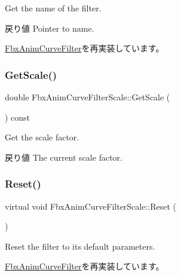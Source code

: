 Get the name of the filter. \begin{DoxyReturn}{戻り値}
Pointer to name. 
\end{DoxyReturn}


\hyperlink{class_fbx_anim_curve_filter_abd559d5052fbb072042e59241940a35c}{Fbx\+Anim\+Curve\+Filter}を再実装しています。

\mbox{\label{class_fbx_anim_curve_filter_scale_a48367ab8cb65db9bffdda7dc8c0afff8}} 
\subsubsection{\texorpdfstring{Get\+Scale()}{GetScale()}}
{\footnotesize\ttfamily double Fbx\+Anim\+Curve\+Filter\+Scale\+::\+Get\+Scale (\begin{DoxyParamCaption}{ }\end{DoxyParamCaption}) const}

Get the scale factor. \begin{DoxyReturn}{戻り値}
The current scale factor. 
\end{DoxyReturn}
\mbox{\label{class_fbx_anim_curve_filter_scale_a40e82207d205b026aaab40e52a7184c8}} 
\subsubsection{\texorpdfstring{Reset()}{Reset()}}
{\footnotesize\ttfamily virtual void Fbx\+Anim\+Curve\+Filter\+Scale\+::\+Reset (\begin{DoxyParamCaption}{ }\end{DoxyParamCaption})\hspace{0.3cm}{\ttfamily [virtual]}}

Reset the filter to its default parameters. 

\hyperlink{class_fbx_anim_curve_filter_a57fb35baaaa85adb08946383cf40e811}{Fbx\+Anim\+Curve\+Filter}を再実装しています。

\mbox{\label{class_fbx_anim_curve_filter_scale_a9c564c7599541607c42d28bb57874eae}} 

